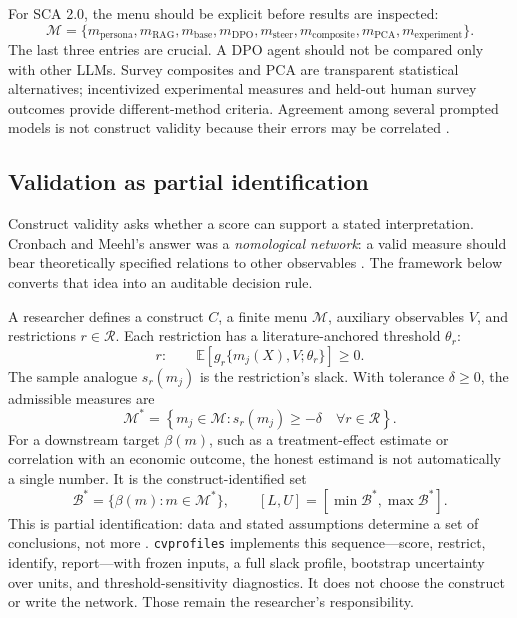 \documentclass[10pt,letterpaper]{article}
\newcommand{\cvp}{\texttt{cvprofiles}}
\newcommand{\M}{\ensuremath{\mathcal{M}}}
\newcommand{\E}{\mathbb{E}}
\begin{document}
For SCA 2.0, the menu should be explicit before results are inspected:
\[
\M=\{m_{\mathrm{persona}},m_{\mathrm{RAG}},m_{\mathrm{base}},m_{\mathrm{DPO}},m_{\mathrm{steer}},m_{\mathrm{composite}},m_{\mathrm{PCA}},m_{\mathrm{experiment}}\}.
\]
The last three entries are crucial. A DPO agent should not be compared only with other LLMs. Survey composites and PCA are transparent statistical alternatives; incentivized experimental measures and held-out human survey outcomes provide different-method criteria. Agreement among several prompted models is not construct validity because their errors may be correlated \cite{campbell1959,ludwig2026}.

\subsection{Validation as partial identification}
Construct validity asks whether a score can support a stated interpretation. Cronbach and Meehl's answer was a \emph{nomological network}: a valid measure should bear theoretically specified relations to other observables \cite{cronbach1955}. The framework below converts that idea into an auditable decision rule.

A researcher defines a construct $C$, a finite menu $\M$, auxiliary observables $V$, and restrictions $r\in\mathcal{R}$. Each restriction has a literature-anchored threshold $\theta_r$:
\begin{equation}
 r:\qquad \E\left[g_r\{m_j(X),V;\theta_r\}\right]\geq 0.
 \label{eq:restriction}
\end{equation}
The sample analogue $s_r(m_j)$ is the restriction's slack. With tolerance $\delta\geq0$, the admissible measures are
\begin{equation}
 \M^*=\left\{m_j\in\M:s_r(m_j)\geq-\delta\quad \forall r\in\mathcal{R}\right\}.
 \label{eq:admissible}
\end{equation}
For a downstream target $\beta(m)$, such as a treatment-effect estimate or correlation with an economic outcome, the honest estimand is not automatically a single number. It is the construct-identified set
\begin{equation}
 \mathcal{B}^*=\{\beta(m):m\in\M^*\},\qquad [L,U]=[\min\mathcal{B}^*,\max\mathcal{B}^*].
 \label{eq:range}
\end{equation}
This is partial identification: data and stated assumptions determine a set of conclusions, not more \cite{manski2003,schennach2021}. \cvp{} implements this sequence---score, restrict, identify, report---with frozen inputs, a full slack profile, bootstrap uncertainty over units, and threshold-sensitivity diagnostics. It does not choose the construct or write the network. Those remain the researcher's responsibility.
\end{document}

